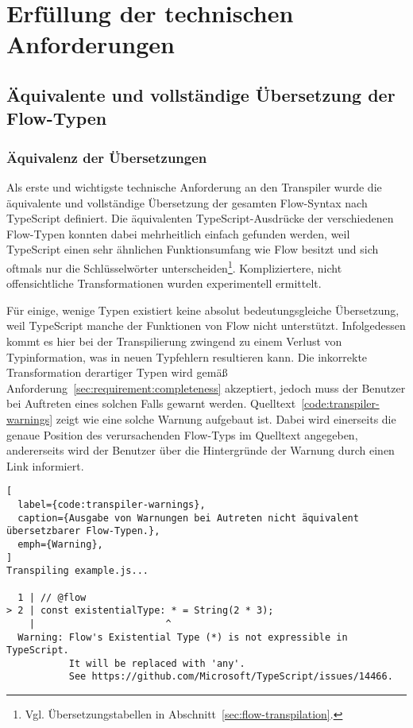 \pagebreak %
\section{Erfüllung der technischen Anforderungen}

\subsection{Äquivalente und vollständige Übersetzung der Flow-Typen}
\label{sec:interpretation:equivalent-translation}

\subsubsection{Äquivalenz der Übersetzungen}

Als erste und wichtigste technische Anforderung an den Transpiler wurde die äquivalente und vollständige Übersetzung der gesamten Flow-Syntax nach TypeScript definiert. Die äquivalenten TypeScript-Ausdrücke der verschiedenen Flow-Typen konnten dabei mehrheitlich einfach gefunden werden, weil TypeScript einen sehr ähnlichen Funktionsumfang wie Flow besitzt und sich oftmals nur die Schlüsselwörter unterscheiden\footnote{Vgl. Übersetzungstabellen in Abschnitt~\ref{sec:flow-transpilation}.}. Kompliziertere, nicht offensichtliche Transformationen wurden experimentell ermittelt.

Für einige, wenige Typen existiert keine absolut bedeutungsgleiche Übersetzung, weil TypeScript manche der Funktionen von Flow nicht unterstützt. Infolgedessen kommt es hier bei der Transpilierung zwingend zu einem Verlust von Typinformation, was in neuen Typfehlern resultieren kann. Die inkorrekte Transformation derartiger Typen wird gemäß Anforderung~\ref{sec:requirement:completeness} akzeptiert, jedoch muss der Benutzer bei Auftreten eines solchen Falls gewarnt werden. Quelltext~\ref{code:transpiler-warnings} zeigt wie eine solche Warnung aufgebaut ist. Dabei wird einerseits die genaue Position des verursachenden Flow-Typs im Quelltext angegeben, andererseits wird der Benutzer über die Hintergründe der Warnung durch einen Link informiert.

\begin{lstlisting}[
  label={code:transpiler-warnings},
  caption={Ausgabe von Warnungen bei Autreten nicht äquivalent übersetzbarer Flow-Typen.},
  emph={Warning},
]
Transpiling example.js...

  1 | // @flow
> 2 | const existentialType: * = String(2 * 3);
    |                       ^
  Warning: Flow's Existential Type (*) is not expressible in TypeScript.
           It will be replaced with 'any'.
           See https://github.com/Microsoft/TypeScript/issues/14466.
\end{lstlisting}

